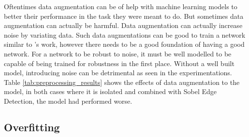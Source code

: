 Oftentimes data augmentation can be of help with machine learning models to better their performance in the task they were meant to do. But sometimes data augmentation can actually be harmful. Data augmentation can actually increase noise by variating data. Such data augmentations can be good to train a network similar to \cite{kim_adaptive_2021}'s work, however there needs to be a good foundation of having a good network. For a network to be robust to noise, it must be well modelled to be capable of being trained for robustness in the first place. Without a well built model, introducing noise can be detrimental as seen in the experimentations. Table \ref{tab:preprocessing_results} shows the effects of data augmentation to the model, in both cases where it is isolated and combined with Sobel Edge Detection, the model had performed worse. 

\subsection{Overfitting}


